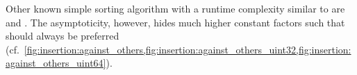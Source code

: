 



\begin{note}
	Other known simple sorting algorithm with a runtime complexity similar to \IS{} are \SelS{} and \BS{}.
	The asymptoticity, however, hides much higher constant factors such that \IS{} should always be preferred (cf.\ \cref{fig:insertion:against_others,fig:insertion:against_others_uint32,fig:insertion:against_others_uint64}).
\end{note}
